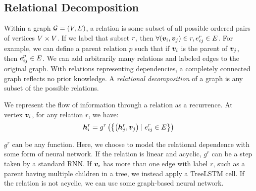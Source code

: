 
\subsection{Relational Decomposition}

Within a graph ${\mathcal{G}}=(V,E)$, a relation is some subset of all 
possible ordered pairs of vertices $V\times V$. If we label that subset 
$r$, then $\forall ({\bm{v}}_i, {\bm{v}}_j)\in r, e_{ij}^r\in E$.  For example, we 
can define a parent relation $p$ such that if ${\bm{v}}_i$ is the parent of ${\bm{v}}_j$, 
then $e_{ij}^p\in E$. We can add arbitrarily many relations and labeled 
edges to the original graph. With relations representing dependencies, a 
completely connected graph reflects no prior knowledge. A \textit{relational 
decomposition} of a graph is any subset of the possible relations.

We represent the flow of information through a relation as a recurrence. At 
vertex ${\bm{v}}_i$, for any relation $r$, we have:
\begin{equation}
	{\bm{h}}^r_i = g^r\left(\left\{\left({\bm{h}}^r_j, {\bm{v}}_{j}\right)\mid e_{ij}^r\in E\right\} 
\right)
\end{equation}

$g^r$ can be any function. Here, we choose to model the relational dependence 
with some form of neural network. If the relation is linear and acyclic, $g^r$ 
can be a step taken by a standard RNN\@. If ${\bm{v}}_i$ has more than one edge with 
label $r$, such as a parent having multiple children in a tree, we instead apply 
a TreeLSTM cell. If the relation is not acyclic, we can use some graph-based 
neural network.


